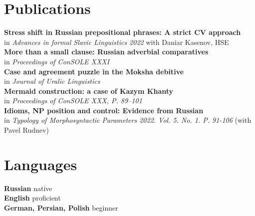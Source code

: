 \documentclass[11pt]{article} %
\begin{document}
\section*{Publications}
 \textbf{Stress shift in Russian prepositional phrases: A strict CV approach} \\ in \emph{Advances in formal Slavic Linguistics 2022} with Daniar Kasenov, HSE\\
 \textbf{More than a small clause: Russian adverbial comparatives} \\ in \emph{Proceedings of ConSOLE XXXI}\\
 \textbf{Case and agreement puzzle in the Moksha debitive} \\ in \emph{Journal of Uralic Linguistics}\\
 \textbf{Mermaid construction: a case of Kazym Khanty}\\ in \emph{Proceedings of ConSOLE XXX, P. 89--101}\\
 \textbf{Idioms, NP position and control: Evidence from Russian}\\ in \emph{Typology of Morphosyntactic Parameters 2022. Vol. 5. No. 1. P. 91-106} (with Pavel Rudnev)\\

\section*{Languages}

\textbf{Russian} native\\
\textbf{English} proficient\\
\textbf{German, Persian, Polish} beginner




\end{document}

